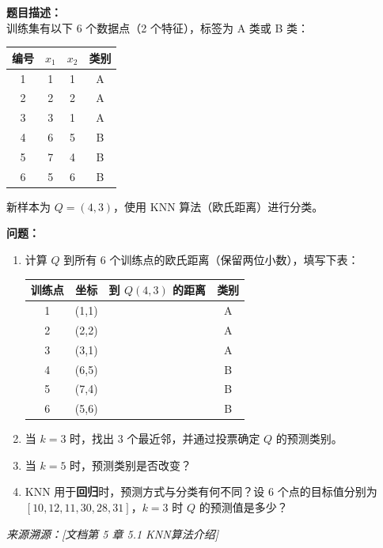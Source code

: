 \documentclass[a4paper,11pt]{ctexart}
\begin{document}
\begin{problembox}
    \textbf{题目描述：}\\
    训练集有以下 6 个数据点（2 个特征），标签为 A 类或 B 类：

    \begin{center}
    \begin{tabular}{cccc}
        \toprule
        编号 & $x_1$ & $x_2$ & 类别 \\
        \midrule
        1 & 1 & 1 & A \\
        2 & 2 & 2 & A \\
        3 & 3 & 1 & A \\
        4 & 6 & 5 & B \\
        5 & 7 & 4 & B \\
        6 & 5 & 6 & B \\
        \bottomrule
    \end{tabular}
    \end{center}

    新样本为 $Q = (4, 3)$，使用 KNN 算法（欧氏距离）进行分类。

    \vspace{0.2cm}
    \textbf{问题：}
    \begin{enumerate}[(1)]
        \item 计算 $Q$ 到所有 6 个训练点的欧氏距离（保留两位小数），填写下表：

        \begin{center}
        \begin{tabular}{cccc}
            \toprule
            训练点 & 坐标 & 到 $Q(4,3)$ 的距离 & 类别 \\
            \midrule
            1 & (1,1) & \underline{\quad} & A \\
            2 & (2,2) & \underline{\quad} & A \\
            3 & (3,1) & \underline{\quad} & A \\
            4 & (6,5) & \underline{\quad} & B \\
            5 & (7,4) & \underline{\quad} & B \\
            6 & (5,6) & \underline{\quad} & B \\
            \bottomrule
        \end{tabular}
        \end{center}

        \item 当 $k=3$ 时，找出 3 个最近邻，并通过投票确定 $Q$ 的预测类别。
        \item 当 $k=5$ 时，预测类别是否改变？
        \item KNN 用于\textbf{回归}时，预测方式与分类有何不同？设 6 个点的目标值分别为 $[10, 12, 11, 30, 28, 31]$，$k=3$ 时 $Q$ 的预测值是多少？
    \end{enumerate}
    {\color{gray}\small\textit{来源溯源：[文档第 5 章 5.1 KNN算法介绍]}}
\end{problembox}
\end{document}
